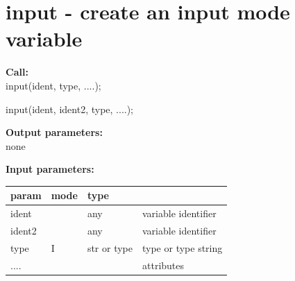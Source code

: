 %
%        
%        
%        
%        
%        
%        
%        



    \section{input - create an input mode variable}\label{sec:ipinput}
        
        {\bf Call:} \\
        input(ident, type, ....);
        
        input({ident, ident2}, type, ....);
        
        {\bf Output parameters:} \\
        none
        
        {\bf Input parameters:} \\
        \begin{tabular}{| l | l | l | l |}
        \hline
        param  & mode     & type  & \\
        \hline \hline
        ident   &     & any          & variable identifier  \\ \hline
        ident2  &     & any          & variable identifier  \\ \hline
        type    & I   & str or type  & type or type string  \\ \hline
        ....    &     &              & attributes           \\ \hline
        \end{tabular}
        
